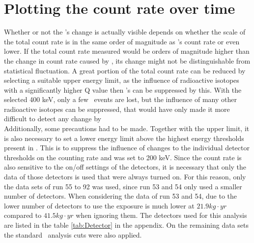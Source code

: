\documentclass[encoding=utf8,british]{tumphthesis}
\begin{document}
\section{Plotting the count rate over time}
\label{sec:plotting}

Whether or not the \Kr's change is actually visible depends on whether the scale of the total count rate is in the same order of magnitude as \Kr's count rate or even lower.
If the total count rate measured would be orders of magnitude higher than the change in count rate caused by \Kr, its change might not be distinguishable from statistical fluctuation.
A great portion of the total count rate can be reduced by selecting a suitable upper energy limit, as the influence of radioactive isotopes with a significantly higher Q value then \Kr's can be suppressed by this.
With the selected 400 keV, only a few \Kr\ events are lost, but the influence of many other radioactive isotopes can be suppressed, that would have only made it more difficult to detect any change by \Kr\.
\\

Additionally, some precautions had to be made.
Together with the upper limit, it is also necessary to set a lower energy limit above the highest energy thresholds present in \PII.
This is to suppress the influence of changes to the individual detector thresholds on the counting rate and was set to 200 keV.
Since the count rate is also sensitive to the on/off settings of the detectors, it is necessary that only the data of those detectors is used that were always turned on.
For this reason, only the data sets of run 55 to 92 was used, since run 53 and 54 only used a smaller number of detectors.
When considering the data of run 53 and 54, due to the lower number of detectors to use the exposure is much lower at $21.9\unit{kg}\cdot\unit{yr}$ compared to $41.5\unit{kg}\cdot\unit{yr}$ when ignoring them.
The detectors used for this analysis are listed in the table \ref{tab:Detector} in the appendix.
On the remaining data sets the standard \gerda\ analysis cuts were also applied.
\\
\end{document}
